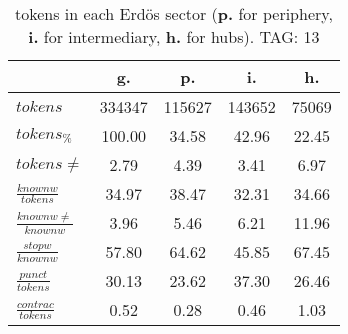 \begin{table}[h!]
\begin{center}
\begin{tabular}{| l | c | c | c | c |}\hline
 & g. & p. & i. & h. \\\hline
$tokens$ & 334347  & 115627  & 143652  & 75069 \\\hline
$tokens_{\%}$ & 100.00  & 34.58  & 42.96  & 22.45 \\\hline
$tokens \neq$ & 2.79  & 4.39  & 3.41  & 6.97 \\\hline
$\frac{knownw}{tokens}$ & 34.97  & 38.47  & 32.31  & 34.66 \\\hline
$\frac{knownw \neq}{knownw}$ & 3.96  & 5.46  & 6.21  & 11.96 \\\hline
$\frac{stopw}{knownw}$ & 57.80  & 64.62  & 45.85  & 67.45 \\\hline
$\frac{punct}{tokens}$ & 30.13  & 23.62  & 37.30  & 26.46 \\\hline
$\frac{contrac}{tokens}$ & 0.52  & 0.28  & 0.46  & 1.03 \\\hline
\end{tabular}
\caption{tokens in each Erd\"os sector ({{\bf p.}} for periphery, {{\bf i.}} for intermediary, 
    {{\bf h.}} for hubs). TAG: 13}
\end{center}
\end{table}